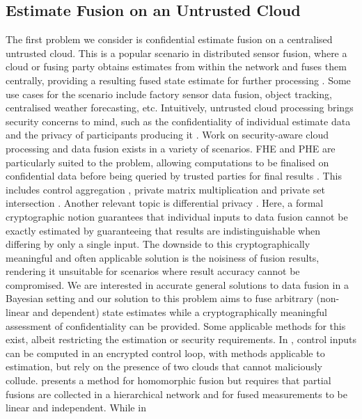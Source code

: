 \subsection{Estimate Fusion on an Untrusted Cloud}\label{subsec:intro:conf_est_fusion}
The first problem we consider is confidential estimate fusion on a centralised untrusted cloud. This is a popular scenario in distributed sensor fusion, where a cloud or fusing party obtains estimates from within the network and fuses them centrally, providing a resulting fused state estimate for further processing \cite{ligginsDistributedFusionArchitectures1997,bar-shalomEffectCommonProcess1986,heRangeFreeLocalizationSchemes2003,congOrderInsensitiveSequential2016,yonggangxuEstimationUncontrolledControlled2005,rosenthalSchedulingMeasurementTransmission2018}. Some use cases for the scenario include factory sensor data fusion, object tracking, centralised weather forecasting, etc. Intuitively, untrusted cloud processing brings security concerns to mind, such as the confidentiality of individual estimate data and the privacy of participants producing it \cite{renSecurityChallengesPublic2012,leiOutsourcingLargeMatrix2013,nandakumarProtectingGridTopology2019,zhangSecureDotProduct2017,schulzedarupEncryptedControlNetworked2021}. Work on security-aware cloud processing and data fusion exists in a variety of scenarios. FHE and PHE are particularly suited to the problem, allowing computations to be finalised on confidential data before being queried by trusted parties for final results \cite{lopez-altOntheflyMultipartyComputation2012,poteyHomomorphicEncryptionSecurity2016,zhaoCloudComputingSecurity2014}. This includes control aggregation \cite{alexandruEncryptedCooperativeControl2019}, private matrix multiplication \cite{kogisoCyberSecurityEnhancementNetworked2015} and private set intersection \cite{kerschbaumOutsourcedPrivateSet2012}. Another relevant topic is differential privacy \cite{dworkDifferentialPrivacySurvey2008,wilsonDifferentiallyPrivateSQL2020}. Here, a formal cryptographic notion guarantees that individual inputs to data fusion cannot be exactly estimated by guaranteeing that results are indistinguishable when differing by only a single input. The downside to this cryptographically meaningful and often applicable solution is the noisiness of fusion results, rendering it unsuitable for scenarios where result accuracy cannot be compromised. We are interested in accurate general solutions to data fusion in a Bayesian setting and our solution to this problem aims to fuse arbitrary (non-linear and dependent) state estimates while a cryptographically meaningful assessment of confidentiality can be provided. Some applicable methods for this exist, albeit restricting the estimation or security requirements. In \cite{daruEncryptedCloudbasedControl2019}, control inputs can be computed in an encrypted control loop, with methods applicable to estimation, but rely on the presence of two clouds that cannot maliciously collude. \cite{aristovEncryptedMultisensorInformation2018} presents a method for homomorphic fusion but requires that partial fusions are collected in a hierarchical network and for fused measurements to be linear and independent. While in 